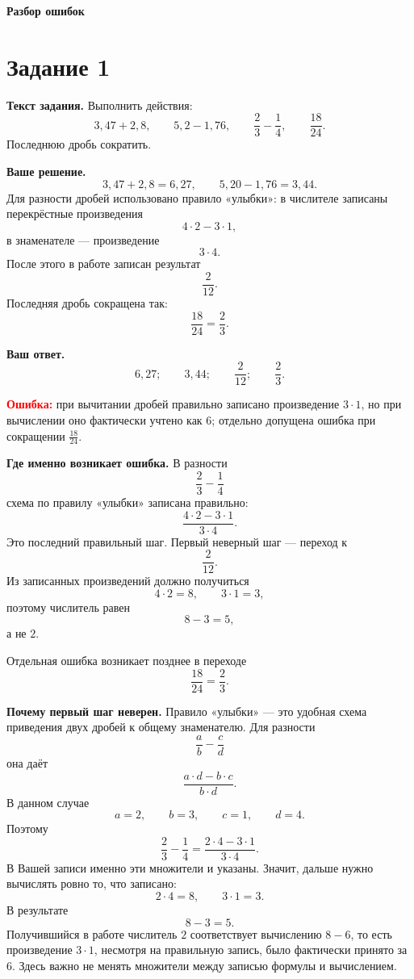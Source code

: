 \documentclass[12pt,a4paper]{article}
\begin{document}
\newpage
\thispagestyle{empty}
\vspace*{\fill}
\begin{center}
{\LARGE\bfseries Разбор ошибок}
\end{center}
\vspace*{\fill}

\newpage
{}\label{task:1}
\section*{Задание 1}

\textbf{Текст задания.} Выполнить действия:
\[
3{,}47+2{,}8,\qquad
5{,}2-1{,}76,\qquad
\frac{2}{3}-\frac{1}{4},\qquad
\frac{18}{24}.
\]
Последнюю дробь сократить.

\textbf{Ваше решение.}
\[
3{,}47+2{,}8=6{,}27,
\qquad
5{,}20-1{,}76=3{,}44.
\]
Для разности дробей использовано правило «улыбки»: в числителе записаны перекрёстные произведения
\[
4\cdot2-3\cdot1,
\]
в знаменателе --- произведение
\[
3\cdot4.
\]
После этого в работе записан результат
\[
\frac{2}{12}.
\]
Последняя дробь сокращена так:
\[
\frac{18}{24}=\frac{2}{3}.
\]

\textbf{Ваш ответ.}
\[
6{,}27;\qquad
3{,}44;\qquad
\frac{2}{12};\qquad
\frac{2}{3}.
\]

\textcolor{red}{\textbf{Ошибка:}} при вычитании дробей правильно записано произведение $3\cdot1$, но при вычислении оно фактически учтено как $6$; отдельно допущена ошибка при сокращении $\frac{18}{24}$.

\textbf{Где именно возникает ошибка.}
В разности
\[
\frac{2}{3}-\frac{1}{4}
\]
схема по правилу «улыбки» записана правильно:
\[
\frac{4\cdot2-3\cdot1}{3\cdot4}.
\]
Это последний правильный шаг. Первый неверный шаг --- переход к
\[
\frac{2}{12}.
\]
Из записанных произведений должно получиться
\[
4\cdot2=8,\qquad 3\cdot1=3,
\]
поэтому числитель равен
\[
8-3=5,
\]
а не $2$.

Отдельная ошибка возникает позднее в переходе
\[
\frac{18}{24}=\frac{2}{3}.
\]

\textbf{Почему первый шаг неверен.}
Правило «улыбки» --- это удобная схема приведения двух дробей к общему знаменателю. Для разности
\[
\frac{a}{b}-\frac{c}{d}
\]
она даёт
\[
\frac{a\cdot d-b\cdot c}{b\cdot d}.
\]
В данном случае
\[
a=2,\qquad b=3,\qquad c=1,\qquad d=4.
\]
Поэтому
\[
\frac{2}{3}-\frac{1}{4}
=
\frac{2\cdot4-3\cdot1}{3\cdot4}.
\]
В Вашей записи именно эти множители и указаны. Значит, дальше нужно вычислять ровно то, что записано:
\[
2\cdot4=8,\qquad 3\cdot1=3.
\]
В результате
\[
8-3=5.
\]
Получившийся в работе числитель $2$ соответствует вычислению $8-6$, то есть произведение $3\cdot1$, несмотря на правильную запись, было фактически принято за $6$. Здесь важно не менять множители между записью формулы и вычислением.
\end{document}
